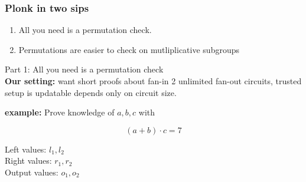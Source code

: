 \documentclass[shadesubsections,trans,14pt,mathserif]{beamer}
\newcommand{\F}{\ensuremath{\mathbb F}}
\newcommand{\polysofdeg}[1]{\F_{< #1}[X]}
\begin{document}
\begin{frame}
\frametitle{Plonk in two sips}   %
 
  \begin{enumerate}

\item All you need is a permutation check.\pause 
 \item Permutations are easier to check on mutliplicative subgroups
\end{enumerate}


\end{frame}


\begin{frame}
\large{Part 1: All you need is a permutation check}\\
 \vspace{0.2in}
\normalsize{\textbf{Our setting:} want short proofs about fan-in 2 unlimited fan-out circuits, trusted setup is updatable depends only on circuit size.}
\end{frame}




\begin{frame}
\textbf{example:} Prove knowledge of $a,b,c$ with
 
 
 
 
 
\[(a+b)\cdot c =7\]




\end{frame}


\begin{frame}
Left values: 
$l_1,l_2$\\
Right values: $r_1,r_2$\\
Output values:
$o_1,o_2$


 \vspace{0.2in}

\end{frame}
\end{document}
